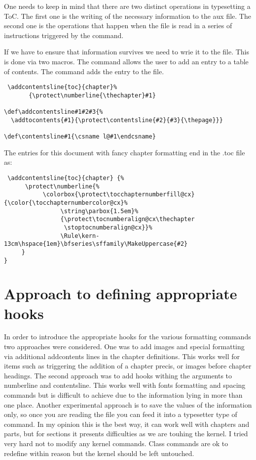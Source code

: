 One needs to keep in mind that there are two distinct operations in typesetting a ToC. The first one is the writing of the necessary information to the aux file. The second one is the operations that happen when the file is read in a series of instructions triggered by the  command.

If we have to ensure that information survives we need to wrie it to the file. This is done via two macros.
The  command allows the user to add an entry to a table of contents. The command adds the entry
 to the  file.

\begin{lstlisting}
 \addcontentsline{toc}{chapter}%
       {\protect\numberline{\thechapter}#1}

\def\addcontentsline#1#2#3{%
  \addtocontents{#1}{\protect\contentsline{#2}{#3}{\thepage}}}

\def\contentsline#1{\csname l@#1\endcsname}
\end{lstlisting}

The entries for this document with fancy chapter formatting end in the .toc file as:
\begin{lstlisting}
 \addcontentsline{toc}{chapter} {%
      \protect\numberline{%
           \colorbox{\protect\tocchapternumberfill@cx}{\color{\tocchapternumbercolor@cx}%
                \string\parbox{1.5em}%
                {\protect\tocnumberalign@cx\thechapter
                 \stoptocnumberalign@cx}}%
                \Rule\kern-13cm\hspace{1em}\bfseries\sffamily\MakeUppercase{#2}
     }
}
\end{lstlisting}


\section{Approach to defining appropriate hooks}

In order to introduce the appropriate hooks for the various formatting commands two approaches were considered. One was to add images and special formatting via additional addcontents lines in the chapter definitions. This works well for items such as triggering the addition of a chapter precis, or images before chapter headings. The second approach was to add hooks withing the arguments to numberline and contentsline. This works well with fonts formatting and spacing commands but is difficult to achieve due to the information lying in more than one place. Another experimental approach is to save the values of the information only, so once you are reading the file you can feed it into a typesetter type of command. In my opinion this is the best way, it can work well with chapters and parts, but for sections it presents difficulties as we are touhing the kernel. I tried very hard not to modify any kernel commands. Class commands are ok to redefine within reason but the kernel should be left untouched.

